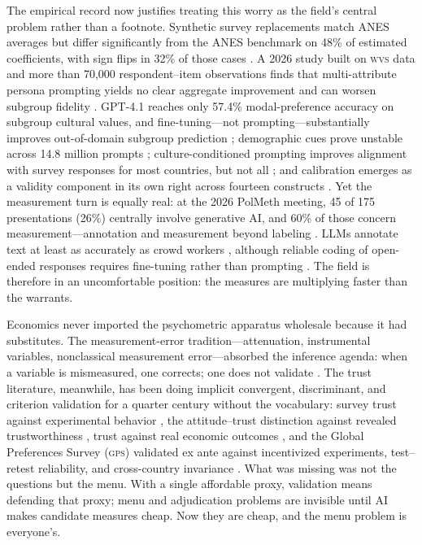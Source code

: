 \documentclass[10pt,letterpaper]{article}
\newcommand{\GPS}{\textsc{gps}}
\newcommand{\WVS}{\textsc{wvs}}
\begin{document}
The empirical record now justifies treating this worry as the field's central problem rather than a footnote. Synthetic survey replacements match ANES averages but differ significantly from the ANES benchmark on 48\% of estimated coefficients, with sign flips in 32\% of those cases \cite{bisbee2024}. A 2026 study built on \WVS{} data and more than 70{,}000 respondent--item observations finds that multi-attribute persona prompting yields no clear aggregate improvement and can worsen subgroup fidelity \cite{morocho2026}. GPT-4.1 reaches only 57.4\% modal-preference accuracy on subgroup cultural values, and fine-tuning---not prompting---substantially improves out-of-domain subgroup prediction \cite{subgroupvalues2026}; demographic cues prove unstable across 14.8 million prompts \cite{tonneau2026}; culture-conditioned prompting improves alignment with survey responses for most countries, but not all \cite{tao2024}; and calibration emerges as a validity component in its own right across fourteen constructs \cite{wangcalibration2026}. Yet the measurement turn is equally real: at the 2026 PolMeth meeting, 45 of 175 presentations (26\%) centrally involve generative AI, and 60\% of those concern measurement---annotation and measurement beyond labeling \cite{hall2026}. LLMs annotate text at least as accurately as crowd workers \cite{gilardi2023}, although reliable coding of open-ended responses requires fine-tuning rather than prompting \cite{landesvatter2026}. The field is therefore in an uncomfortable position: the measures are multiplying faster than the warrants.

Economics never imported the psychometric apparatus wholesale because it had substitutes. The measurement-error tradition---attenuation, instrumental variables, nonclassical measurement error---absorbed the inference agenda: when a variable is mismeasured, one corrects; one does not validate \cite{hu2008,chen2011,schennach2021}. The trust literature, meanwhile, has been doing implicit convergent, discriminant, and criterion validation for a quarter century without the vocabulary: survey trust against experimental behavior \cite{glaeser2000}, the attitude--trust distinction against revealed trustworthiness \cite{sapienza2013}, trust against real economic outcomes \cite{butler2016}, and the Global Preferences Survey (\GPS{}) validated ex ante against incentivized experiments, test--retest reliability, and cross-country invariance \cite{falk2018,falk2023}. What was missing was not the questions but the menu. With a single affordable proxy, validation means defending that proxy; menu and adjudication problems are invisible until AI makes candidate measures cheap. Now they are cheap, and the menu problem is everyone's.
\end{document}
